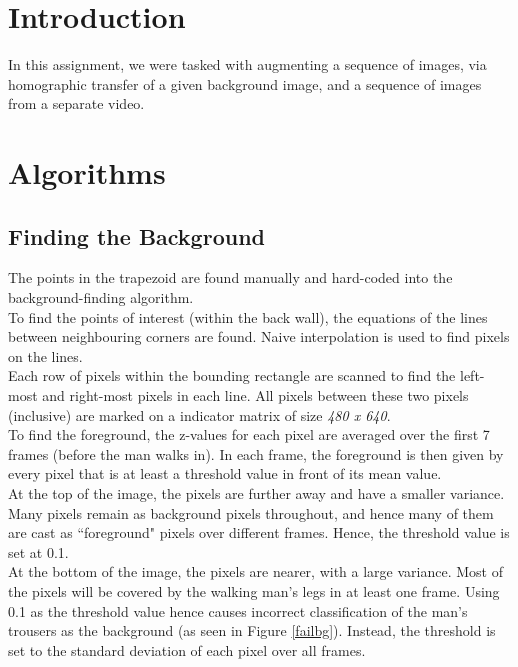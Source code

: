 \documentclass[11pt]{article}
\title{\thetitle}
\author{\theauthor}
\date{}
\begin{document}
\maketitle
\thispagestyle{empty}

\section{Introduction}

In this assignment, we were tasked with augmenting a sequence of images, via homographic transfer of a given background image, and a sequence of images from a separate video.

\section{Algorithms}
\subsection{Finding the Background}
The points in the trapezoid are found manually and hard-coded into the background-finding algorithm. \\

To find the points of interest (within the back wall), the equations of the lines between neighbouring corners are found. Naive interpolation is used to find pixels on the lines. \\

Each row of pixels within the bounding rectangle are scanned to find the left-most and right-most pixels in each line. All pixels between these two pixels (inclusive) are marked on a indicator matrix of size \emph{480 x 640}. \\

To find the foreground, the z-values for each pixel are averaged over the first 7 frames (before the man walks in). In each frame, the foreground is then given by every pixel that is at least a threshold value in front of its mean value. \\

At the top of the image, the pixels are further away and have a smaller variance. Many pixels remain as background pixels throughout, and hence many of them are cast as ``foreground" pixels over different frames. Hence, the threshold value is set at 0.1. \\

At the bottom of the image, the pixels are nearer, with a large variance. Most of the pixels will be covered by the walking man's legs in at least one frame. Using 0.1 as the threshold value hence causes incorrect classification of the man's trousers as the background (as seen in Figure \ref{failbg}). Instead, the threshold is set to the standard deviation of each pixel over all frames. \\
\end{document}
